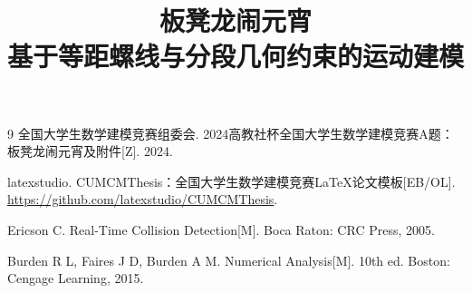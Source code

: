 \documentclass[bwprint]{cumcmthesis}
\title{板凳龙闹元宵\\基于等距螺线与分段几何约束的运动建模}
\begin{document}
\maketitle
{}














\begin{thebibliography}{9}
全国大学生数学建模竞赛组委会.
2024高教社杯全国大学生数学建模竞赛A题：板凳龙闹元宵及附件[Z].
2024.

latexstudio.
CUMCMThesis：全国大学生数学建模竞赛\LaTeX{}论文模板[EB/OL].
\url{https://github.com/latexstudio/CUMCMThesis}.

Ericson C.
Real-Time Collision Detection[M].
Boca Raton: CRC Press, 2005.

Burden R L, Faires J D, Burden A M.
Numerical Analysis[M].
10th ed.
Boston: Cengage Learning, 2015.
\end{thebibliography}
\end{document}
